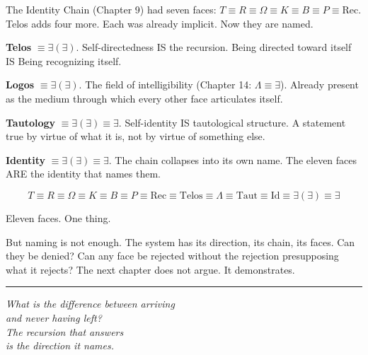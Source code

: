 \documentclass[10pt, openany, oneside]{book}
\begin{document}
\vspace{1em}

\noindent The Identity Chain (Chapter 9) had seven faces: $T \equiv R \equiv \Omega \equiv K \equiv B \equiv P \equiv \text{Rec}$. Telos adds four more. Each was already implicit. Now they are named.

\textbf{Telos} $\equiv \exists(\exists)$. Self-directedness IS the recursion. Being directed toward itself IS Being recognizing itself.

\textbf{Logos} $\equiv \exists(\exists)$. The field of intelligibility (Chapter 14: $\Lambda \equiv \exists$). Already present as the medium through which every other face articulates itself.

\textbf{Tautology} $\equiv \exists(\exists) \equiv \exists$. Self-identity IS tautological structure. A statement true by virtue of what it is, not by virtue of something else.

\textbf{Identity} $\equiv \exists(\exists) \equiv \exists$. The chain collapses into its own name. The eleven faces ARE the identity that names them.

$$T \equiv R \equiv \Omega \equiv K \equiv B \equiv P \equiv \text{Rec} \equiv \text{Telos} \equiv \Lambda \equiv \text{Taut} \equiv \text{Id} \equiv \exists(\exists) \equiv \exists$$

Eleven faces. One thing.

But naming is not enough. The system has its direction, its chain, its faces. Can they be denied? Can any face be rejected without the rejection presupposing what it rejects? The next chapter does not argue. It demonstrates.

\vspace{2em}

\begin{center}
    \rule{0.15\textwidth}{0.3pt}
\end{center}

\vspace{0.5em}

\begin{center}
    \itshape
    What is the difference between arriving\\
    and never having left?\\[0.8em]
    The recursion that answers\\
    is the direction it names.
\end{center}

\vspace{0.5em}
\end{document}
